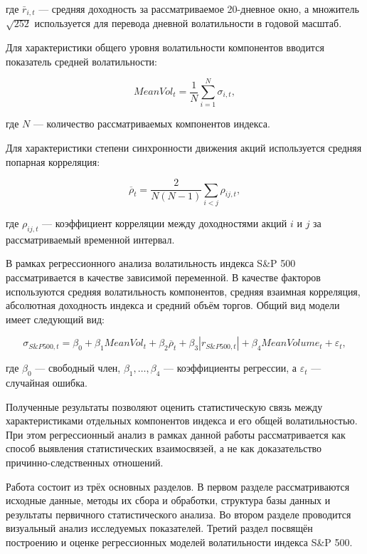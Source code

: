 \documentclass[12pt]{article}
\begin{document}
где $\bar r_{i,t}$ --- средняя доходность за рассматриваемое 20-дневное окно, а множитель $\sqrt{252}$ используется для перевода дневной волатильности в годовой масштаб.

Для характеристики общего уровня волатильности компонентов вводится показатель средней волатильности:

\begin{equation}
MeanVol_t =
\frac{1}{N}
\sum_{i=1}^{N}\sigma_{i,t},
\end{equation}

где $N$ --- количество рассматриваемых компонентов индекса.

Для характеристики степени синхронности движения акций используется средняя попарная корреляция:

\begin{equation}
\overline{\rho}_t =
\frac{2}{N(N-1)}
\sum_{i<j}\rho_{ij,t},
\end{equation}

где $\rho_{ij,t}$ --- коэффициент корреляции между доходностями акций $i$ и $j$ за рассматриваемый временной интервал.

В рамках регрессионного анализа волатильность индекса S\&P 500 рассматривается в качестве зависимой переменной. В качестве факторов используются средняя волатильность компонентов, средняя взаимная корреляция, абсолютная доходность индекса и средний объём торгов. Общий вид модели имеет следующий вид:

\begin{equation}
\sigma_{S\&P500,t}
=
\beta_0
+
\beta_1 MeanVol_t
+
\beta_2 \overline{\rho}_t
+
\beta_3 |r_{S\&P500,t}|
+
\beta_4 MeanVolume_t
+
\varepsilon_t,
\end{equation}

где $\beta_0$ --- свободный член, $\beta_1,\ldots,\beta_4$ --- коэффициенты регрессии, а $\varepsilon_t$ --- случайная ошибка.

Полученные результаты позволяют оценить статистическую связь между характеристиками отдельных компонентов индекса и его общей волатильностью. При этом регрессионный анализ в рамках данной работы рассматривается как способ выявления статистических взаимосвязей, а не как доказательство причинно-следственных отношений.

Работа состоит из трёх основных разделов. В первом разделе рассматриваются исходные данные, методы их сбора и обработки, структура базы данных и результаты первичного статистического анализа. Во втором разделе проводится визуальный анализ исследуемых показателей. Третий раздел посвящён построению и оценке регрессионных моделей волатильности индекса S\&P 500.
\end{document}
